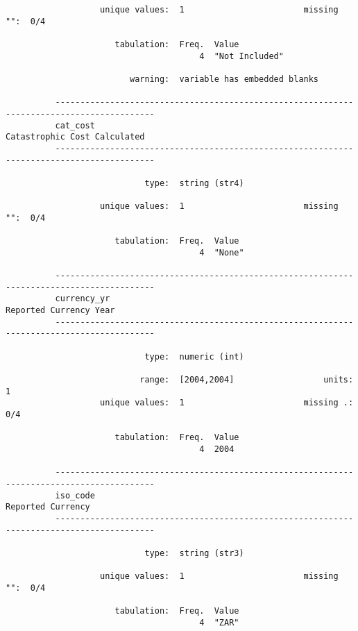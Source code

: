 \documentclass{article}
\begin{document}
\begin{verbatim}
                   unique values:  1                        missing "":  0/4
          
                      tabulation:  Freq.  Value
                                       4  "Not Included"
          
                         warning:  variable has embedded blanks
          
          ------------------------------------------------------------------------------------------
          cat_cost                                                      Catastrophic Cost Calculated
          ------------------------------------------------------------------------------------------
          
                            type:  string (str4)
          
                   unique values:  1                        missing "":  0/4
          
                      tabulation:  Freq.  Value
                                       4  "None"
          
          ------------------------------------------------------------------------------------------
          currency_yr                                                         Reported Currency Year
          ------------------------------------------------------------------------------------------
          
                            type:  numeric (int)
          
                           range:  [2004,2004]                  units:  1
                   unique values:  1                        missing .:  0/4
          
                      tabulation:  Freq.  Value
                                       4  2004
          
          ------------------------------------------------------------------------------------------
          iso_code                                                                 Reported Currency
          ------------------------------------------------------------------------------------------
          
                            type:  string (str3)
          
                   unique values:  1                        missing "":  0/4
          
                      tabulation:  Freq.  Value
                                       4  "ZAR"
          

\end{verbatim}
\end{document}
